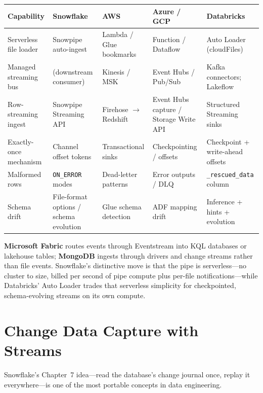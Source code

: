 \begin{center}
\footnotesize
\begin{tabular}{@{}p{2.5cm}p{2.9cm}p{2.7cm}p{2.9cm}p{2.9cm}@{}}
\toprule
\textbf{Capability} & \textbf{Snowflake} & \textbf{AWS} & \textbf{Azure / GCP} & \textbf{Databricks} \\
\midrule
Serverless file loader & Snowpipe auto-ingest & Lambda / Glue bookmarks & Function / Dataflow & Auto Loader (cloudFiles) \\
Managed streaming bus & (downstream consumer) & Kinesis / MSK & Event Hubs / Pub/Sub & Kafka connectors; Lakeflow \\
Row-streaming ingest & Snowpipe Streaming API & Firehose $\rightarrow$ Redshift & Event Hubs capture / Storage Write API & Structured Streaming sinks \\
Exactly-once mechanism & Channel offset tokens & Transactional sinks & Checkpointing / offsets & Checkpoint + write-ahead offsets \\
Malformed rows & \texttt{ON\_ERROR} modes & Dead-letter patterns & Error outputs / DLQ & \texttt{\_rescued\_data} column \\
Schema drift & File-format options / schema evolution & Glue schema detection & ADF mapping drift & Inference + hints + evolution \\
\bottomrule
\end{tabular}
\end{center}

\noindent \textbf{Microsoft Fabric} routes events through Eventstream into KQL databases or
lakehouse tables; \textbf{MongoDB} ingests through drivers and change streams rather than file
events. Snowflake's distinctive move is that the pipe is serverless---no cluster to size, billed
per second of pipe compute plus per-file notifications---while Databricks' Auto Loader trades
that serverless simplicity for checkpointed, schema-evolving streams on its own compute.

\section{Change Data Capture with Streams}
%
Snowflake's Chapter~7 idea---read the database's change journal once, replay it everywhere---is
one of the most portable concepts in data engineering.

